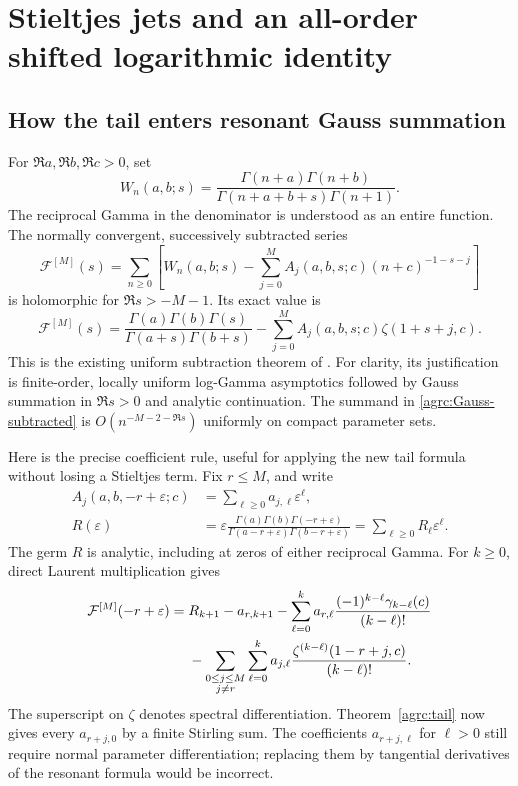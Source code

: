 \section{Stieltjes jets and an all-order shifted logarithmic identity}
\label{agrc:Stieltjes-sums}

\subsection{How the tail enters resonant Gauss summation}

For $\Re a,\Re b,\Re c>0$, set
\[
 W_n(a,b;s)=\frac{\Gamma(n+a)\Gamma(n+b)}
                 {\Gamma(n+a+b+s)\Gamma(n+1)}.
\]
The reciprocal Gamma in the denominator is understood as an entire
function. The normally convergent, successively subtracted series
\begin{equation}\label{agrc:Gauss-subtracted}
 \mathcal F^{[M]}(s)=\sum_{n\geq0}
 \left[W_n(a,b;s)-\sum_{j=0}^M A_j(a,b,s;c)(n+c)^{-1-s-j}\right]
\end{equation}
is holomorphic for $\Re s>-M-1$. Its exact value is
\begin{equation}\label{agrc:Gauss-closed}
 \mathcal F^{[M]}(s)=
 \frac{\Gamma(a)\Gamma(b)\Gamma(s)}{\Gamma(a+s)\Gamma(b+s)}
       -\sum_{j=0}^M A_j(a,b,s;c)\zeta(1+s+j,c).
\end{equation}
This is the existing uniform subtraction theorem of \cite{repo-gauss}.
For clarity, its justification is finite-order, locally uniform
log-Gamma asymptotics followed by Gauss summation in $\Re s>0$ and
analytic continuation. The summand in \eqref{agrc:Gauss-subtracted}
is $O(n^{-M-2-\Re s})$ uniformly on compact parameter sets.

Here is the precise coefficient rule, useful for applying the new tail
formula without losing a Stieltjes term. Fix $r\leq M$, and write
\begin{align*}
 A_j(a,b,-r+\varepsilon;c)&=\sum_{\ell\geq0}a_{j,\ell}\varepsilon^\ell,\\
 R(\varepsilon)&=\varepsilon
 \frac{\Gamma(a)\Gamma(b)\Gamma(-r+\varepsilon)}
      {\Gamma(a-r+\varepsilon)\Gamma(b-r+\varepsilon)}
       =\sum_{\ell\geq0}R_\ell\varepsilon^\ell.
\end{align*}
The germ $R$ is analytic, including at zeros of either reciprocal Gamma.
For $k\geq0$, direct Laurent multiplication gives
\begin{align}
 [\varepsilon^k]\mathcal F^{[M]}(-r+\varepsilon)
 ={}&R_{k+1}-a_{r,k+1}
 -\sum_{\ell=0}^k a_{r,\ell}
           \frac{(-1)^{k-\ell}\gamma_{k-\ell}(c)}{(k-\ell)!}\notag\\
 &-\sum_{\substack{0\leq j\leq M\\j\ne r}}\sum_{\ell=0}^k
   a_{j,\ell}\frac{\zeta^{(k-\ell)}(1-r+j,c)}{(k-\ell)!}.
 \label{agrc:Gauss-jets}
\end{align}
The superscript on $\zeta$ denotes spectral differentiation.
Theorem~\ref{agrc:tail} now gives every $a_{r+j,0}$ by a finite Stirling
sum. The coefficients $a_{r+j,\ell}$ for $\ell>0$ still require normal
parameter differentiation; replacing them by tangential derivatives of
the resonant formula would be incorrect.

